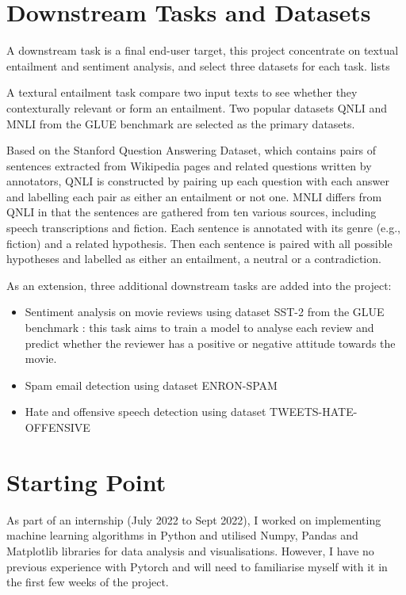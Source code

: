 \section{Downstream Tasks and Datasets}
A downstream task is a final end-user target, this project concentrate on textual entailment and sentiment analysis, and select three datasets for each task.  lists 



A textural entailment task compare two input texts to see whether they contexturally relevant or form an entailment. Two popular datasets QNLI and MNLI from the GLUE benchmark \cite{Wang18glue} are selected as the primary datasets. 


Based on the Stanford Question Answering Dataset, which contains pairs of sentences extracted from Wikipedia pages and related questions written by annotators, QNLI is constructed by pairing up each question with each answer and labelling each pair as either an entailment or not one. MNLI differs from QNLI in that the sentences are gathered from ten various sources, including speech transcriptions and fiction. Each sentence is annotated with its genre (e.g., fiction) and a related hypothesis. Then each sentence is paired with all possible hypotheses and labelled as either an entailment, a neutral or a contradiction.

As an extension, three additional downstream tasks are added into the project:
\begin{itemize}
    \item Sentiment analysis on movie reviews using dataset SST-2 from the GLUE benchmark \cite{Wang18glue}: this task aims to train a model to analyse each review and predict whether the reviewer has a positive or negative attitude towards the movie.
    \item Spam email detection using dataset ENRON-SPAM \cite{}
    \item Hate and offensive speech detection using dataset TWEETS-HATE-OFFENSIVE \cite{}
\end{itemize} 

\section{Starting Point}
As part of an internship (July 2022 to Sept 2022), I worked on implementing machine learning algorithms in Python and utilised Numpy, Pandas and Matplotlib libraries for data analysis and visualisations. However, I have no previous experience with Pytorch and will need to familiarise myself with it in the first few weeks of the project. 

